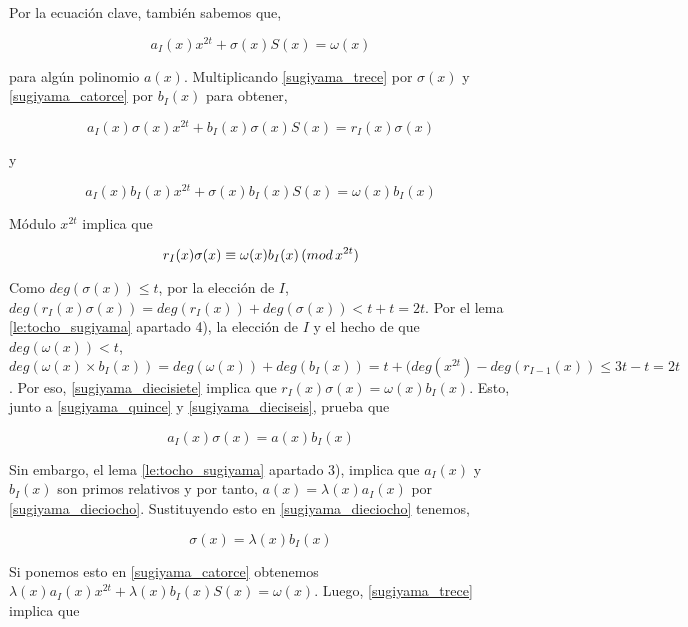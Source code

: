 Por la ecuación clave, también sabemos que,

\begin{equation}
\label{sugiyama_catorce}
a_I(x)x^{2t} + \sigma(x)S(x) = \omega(x)
\end{equation}

para algún polinomio $a(x)$. Multiplicando \ref{sugiyama_trece} por $\sigma(x)$ y \ref{sugiyama_catorce} por $b_I(x)$ para obtener,

\begin{equation}
\label{sugiyama_quince}
a_I(x)\sigma(x)x^{2t} + b_I(x)\sigma(x)S(x) = r_I(x)\sigma(x)
\end{equation}

y

\begin{equation}
\label{sugiyama_dieciseis}
a_I(x)b_I(x)x^{2t} + \sigma(x)b_I(x)S(x) = \omega(x)b_I(x)
\end{equation}


Módulo $x^{2t}$ implica que 

\begin{equation}
\label{sugiyama_diecisiete}
r_I(x)\sigma(x) \equiv \omega(x)b_I(x) \thinspace (mod \thinspace x^{2t})
\end{equation}


Como $deg(\sigma(x)) \leq t$, por la elección de $I$, $deg(r_I(x)\sigma(x)) = deg(r_I(x)) + deg(\sigma(x)) < t + t = 2t$. Por el lema \ref{le:tocho_sugiyama} apartado 4), la elección de $I$ y el hecho de que $deg(\omega(x)) < t$, $deg(\omega(x) \times b_I(x)) = deg(\omega(x)) + deg(b_I(x)) = t + (deg(x^{2t}) -deg(r_{I-1}(x)) \leq 3t -t = 2t$. Por eso, \ref{sugiyama_diecisiete} implica que $r_I(x)\sigma(x) = \omega(x)b_I(x)$. Esto, junto a \ref{sugiyama_quince} y \ref{sugiyama_dieciseis}, prueba que 


\begin{equation}
\label{sugiyama_dieciocho}
a_I(x)\sigma(x) = a(x)b_I(x)
\end{equation}

Sin embargo, el lema \ref{le:tocho_sugiyama} apartado 3), implica que $a_I(x)$ y $b_I(x)$ son primos relativos y por tanto, $a(x) = \lambda(x)a_I(x)$ por  \ref{sugiyama_dieciocho}. Sustituyendo esto en \ref{sugiyama_dieciocho} tenemos,

\begin{equation}
\label{sugiyama_diecinueve}
\sigma(x) = \lambda(x)b_I(x)
\end{equation}

Si ponemos esto en \ref{sugiyama_catorce} obtenemos $\lambda(x)a_I(x)x^{2t} + \lambda(x)b_I(x)S(x) = \omega(x)$. Luego, \ref{sugiyama_trece} implica que

